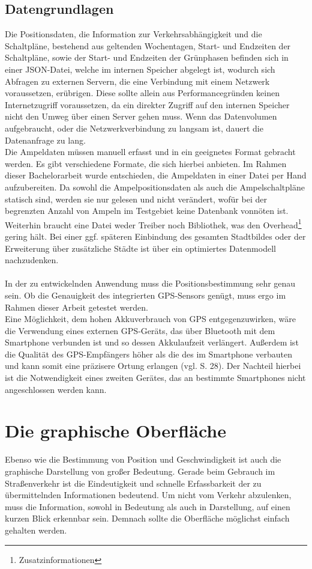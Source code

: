 \subsection{Datengrundlagen}
Die Positionsdaten, die Information zur Verkehrsabhängigkeit und die Schaltpläne, bestehend aus geltenden Wochentagen, Start- und Endzeiten der Schaltpläne, sowie der Start- und Endzeiten der Grünphasen befinden sich in einer \gls{JSON}-Datei, welche im internen Speicher abgelegt ist, wodurch sich Abfragen zu externen Servern, die eine Verbindung mit einem Netzwerk voraussetzen, erübrigen. Diese sollte allein aus Performancegründen keinen Internetzugriff voraussetzen, da ein direkter Zugriff auf den internen Speicher nicht den Umweg über einen Server gehen muss. Wenn das Datenvolumen aufgebraucht, oder die Netzwerkverbindung zu langsam ist, dauert die Datenanfrage zu lang.\\
Die Ampeldaten müssen manuell erfasst und in ein geeignetes Format gebracht werden. Es gibt verschiedene Formate, die sich hierbei anbieten. Im Rahmen dieser Bachelorarbeit wurde entschieden, die Ampeldaten in einer Datei per Hand aufzubereiten. Da sowohl die Ampelpositionsdaten als auch die Ampelschaltpläne statisch sind, werden sie nur gelesen und nicht verändert, wofür bei der begrenzten Anzahl von Ampeln im Testgebiet keine Datenbank vonnöten ist. Weiterhin braucht eine Datei weder Treiber noch Bibliothek, was den Overhead\footnote{ Zusatzinformationen} gering hält. 
Bei einer ggf. späteren Einbindung des gesamten Stadtbildes oder der Erweiterung über zusätzliche Städte ist über ein optimiertes Datenmodell nachzudenken. \\\\
In der zu entwickelnden Anwendung muss die Positionsbestimmung sehr genau sein. Ob die Genauigkeit des integrierten \gls{GPS}-Sensors genügt, muss ergo im Rahmen dieser Arbeit getestet werden. \\
Eine Möglichkeit, dem hohen Akkuverbrauch von \gls{GPS} entgegenzuwirken, wäre die Verwendung eines externen \gls{GPS}-Geräts, das über Bluetooth mit dem \gls{Smartphone} verbunden ist und so dessen Akkulaufzeit verlängert. Außerdem ist die Qualität des \gls{GPS}-Empfängers höher als die des im \gls{Smartphone} verbauten und kann somit eine präzisere Ortung erlangen (vgl. \cite{gps} S. 28). Der Nachteil hierbei ist die Notwendigkeit eines zweiten Gerätes, das an bestimmte Smartphones nicht angeschlossen werden kann. 
\section{Die graphische Oberfläche}
Ebenso wie die Bestimmung von Position und Geschwindigkeit ist auch die graphische Darstellung von großer Bedeutung. Gerade beim Gebrauch im Straßenverkehr ist die Eindeutigkeit und schnelle Erfassbarkeit der zu übermittelnden Informationen bedeutend. Um nicht vom Verkehr abzulenken, muss die Information, sowohl in Bedeutung als auch in Darstellung, auf einen kurzen Blick erkennbar sein. Demnach sollte die Oberfläche möglichst einfach gehalten werden.
